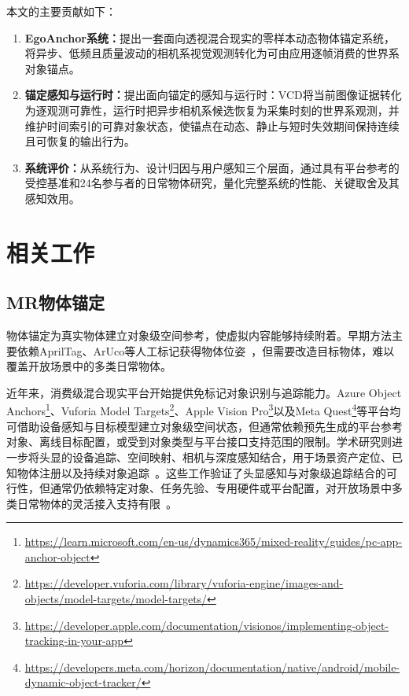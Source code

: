 \documentclass[review]{vgtc}
\begin{document}
本文的主要贡献如下：

\begin{enumerate}
  \item \textbf{EgoAnchor系统：}提出一套面向透视混合现实的零样本动态物体锚定系统，将异步、低频且质量波动的相机系视觉观测转化为可由应用逐帧消费的世界系对象锚点。
  
  \item \textbf{锚定感知与运行时：}提出面向锚定的感知与运行时：VCD将当前图像证据转化为逐观测可靠性，运行时把异步相机系候选恢复为采集时刻的世界系观测，并维护时间索引的可靠对象状态，使锚点在动态、静止与短时失效期间保持连续且可恢复的输出行为。

  \item \textbf{系统评价：}从系统行为、设计归因与用户感知三个层面，通过具有平台参考的受控基准和24名参与者的日常物体研究，量化完整系统的性能、关键取舍及其感知效用。
\end{enumerate}

\section{相关工作}\label{sec:related-work}

\subsection{MR物体锚定}

物体锚定为真实物体建立对象级空间参考，使虚拟内容能够持续附着。早期方法主要依赖AprilTag、ArUco等人工标记获得物体位姿~\cite{apriltag2011,aruco2014}，但需要改造目标物体，难以覆盖开放场景中的多类日常物体。

近年来，消费级混合现实平台开始提供免标记对象识别与追踪能力。Azure Object Anchors\footnote{\url{https://learn.microsoft.com/en-us/dynamics365/mixed-reality/guides/pc-app-anchor-object}}、Vuforia Model Targets\footnote{\url{https://developer.vuforia.com/library/vuforia-engine/images-and-objects/model-targets/model-targets/}}、Apple Vision Pro\footnote{\url{https://developer.apple.com/documentation/visionos/implementing-object-tracking-in-your-app}}以及Meta Quest\footnote{\url{https://developers.meta.com/horizon/documentation/native/android/mobile-dynamic-object-tracker/}}等平台均可借助设备感知与目标模型建立对象级空间状态，但通常依赖预先生成的平台参考对象、离线目标配置，或受到对象类型与平台接口支持范围的限制。学术研究则进一步将头显的设备追踪、空间映射、相机与深度感知结合，用于场景资产定位、已知物体注册以及持续对象追踪~\cite{farasin2020hololens,fan2021assettracking,haxthausen2021hololens,doughty2022hmdegopose,pollabauer2023hololens,martingomez2024sttar,trojak2025mixedpose,greene2025markerless,trojak2026markerless,gbot2024,banerjee2025hot3d,kari2025realitypromises}。这些工作验证了头显感知与对象级追踪结合的可行性，但通常仍依赖特定对象、任务先验、专用硬件或平台配置，对开放场景中多类日常物体的灵活接入支持有限~\cite{hurt2025surrealitycv}。
\end{document}
